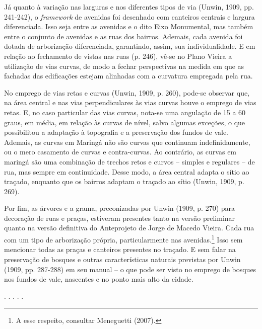 \documentclass[12pt, a4paper]{book} %
\begin{document}
        Já quanto à variação nas larguras e nos diferentes tipos de via (Unwin, 1909, pp. 241-242), o \textit{framework} de avenidas foi desenhado com canteiros centrais e largura diferenciada. Isso seja entre as avenidas e o dito Eixo Monumental, mas também entre o conjunto de avenidas e as ruas dos bairros. Ademais, cada avenida foi dotada de arborização diferenciada, garantindo, assim, sua individualidade. E em relação ao fechamento de vistas nas ruas (p. 246), vê-se no Plano Vieira a utilização de vias curvas, de modo a fechar perspectivas na medida em que as fachadas das edificações estejam alinhadas com a curvatura empregada pela rua.

        No emprego de vias retas e curvas (Unwin, 1909, p. 260), pode-se observar que, na área central e nas vias perpendiculares às vias curvas houve o emprego de vias retas. E, no caso particular das vias curvas, nota-se uma angulação de 15 a 60 graus, em média, em relação às curvas de nível, salvo algumas exceções, o que possibilitou a adaptação à topografia e a preservação dos fundos de vale. Ademais, as curvas em Maringá não são curvas que continuam indefinidamente, ou o mero casamento de curvas e contra-curvas. Ao contrário, as curvas em maringá são uma combinação de trechos retos e curvos – simples e regulares – de rua, mas sempre em continuidade. Desse modo, a área central adapta o sítio ao traçado, enquanto que os bairros adaptam o traçado ao sítio (Unwin, 1909, p. 269).

        Por fim, as árvores e a grama, preconizadas por Unwin (1909, p. 270) para decoração de ruas e praças, estiveram presentes tanto na versão preliminar quanto na versão definitiva do Anteprojeto de Jorge de Macedo Vieira. Cada rua com um tipo de arborização própria, particularmente nas avenidas.\footnote[101]{A esse respeito, consultar Meneguetti (2007).} Isso sem mencionar todas as praças e canteiros presentes no traçado. E sem falar na preservação de bosques e outras características naturais previstas por Unwin (1909, pp. 287-288) em seu manual – o que pode ser visto no emprego de bosques nos fundos de vale, nascentes e no ponto mais alto da cidade.

        \begin{center}
            . . . . .
        \end{center} 
\end{document}
